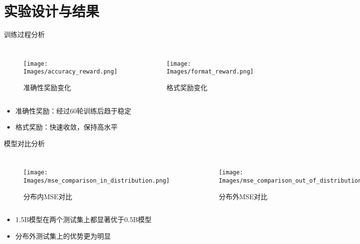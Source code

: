 \section{实验设计与结果}

\begin{frame}{训练过程分析}
    \begin{columns}
        \begin{figure}
            \texttt{[image: Images/accuracy\_reward.png]}
            \caption{准确性奖励变化}
        \end{figure}
        \begin{figure}
            \texttt{[image: Images/format\_reward.png]}
            \caption{格式奖励变化}
        \end{figure}
    \end{columns}
    \begin{itemize}
        \item 准确性奖励：经过60轮训练后趋于稳定
        \item 格式奖励：快速收敛，保持高水平
    \end{itemize}
\end{frame}

\begin{frame}{模型对比分析}
    \begin{columns}
        \begin{figure}
            \texttt{[image: Images/mse\_comparison\_in\_distribution.png]}
            \caption{分布内MSE对比}
        \end{figure}
        \begin{figure}
            \texttt{[image: Images/mse\_comparison\_out\_of\_distribution.png]}
            \caption{分布外MSE对比}
        \end{figure}
    \end{columns}
    \begin{itemize}
        \item 1.5B模型在两个测试集上都显著优于0.5B模型
        \item 分布外测试集上的优势更为明显
    \end{itemize}
\end{frame}

